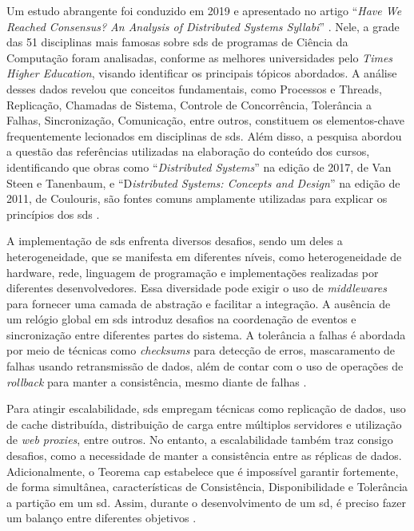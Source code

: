 Um estudo abrangente foi conduzido em 2019 e apresentado no artigo ``\textit{Have We Reached Consensus? An Analysis of Distributed Systems Syllabi}'' \cite{HaveWeReachedConsensus}. Nele, a grade das 51 disciplinas mais famosas sobre \gls{sds} de programas de Ciência da Computação foram analisadas, conforme as melhores universidades pelo \textit{Times Higher Education}, visando identificar os principais tópicos abordados. A análise desses dados revelou que conceitos fundamentais, como Processos e Threads, Replicação, Chamadas de Sistema, Controle de Concorrência, Tolerância a Falhas, Sincronização, Comunicação, entre outros, constituem os elementos-chave frequentemente lecionados em disciplinas de \gls{sds}. Além disso, a pesquisa abordou a questão das referências utilizadas na elaboração do conteúdo dos cursos, identificando que obras como ``\textit{Distributed Systems}'' na edição de 2017, de Van Steen e Tanenbaum, e ``D\textit{istributed Systems: Concepts and Design}'' na edição de 2011, de Coulouris, são fontes comuns amplamente utilizadas para explicar os princípios dos \gls{sds} \cite{HaveWeReachedConsensus}.

A implementação de \gls{sds} enfrenta diversos desafios, sendo um deles a heterogeneidade, que se manifesta em diferentes níveis, como heterogeneidade de hardware, rede, linguagem de programação e implementações realizadas por diferentes desenvolvedores. Essa diversidade pode exigir o uso de \textit{middlewares} para fornecer uma camada de abstração e facilitar a integração. A ausência de um relógio global em \gls{sds} introduz desafios na coordenação de eventos e sincronização entre diferentes partes do sistema. A tolerância a falhas é abordada por meio de técnicas como \textit{checksums} para detecção de erros, mascaramento de falhas usando retransmissão de dados, além de contar com o uso de operações de \textit{rollback} para manter a consistência, mesmo diante de falhas \cite{DistributedSystemsCoulouris}.

Para atingir escalabilidade, \gls{sds} empregam técnicas como replicação de dados, uso de cache distribuída, distribuição de carga entre múltiplos servidores e utilização de \textit{web proxies}, entre outros. No entanto, a escalabilidade também traz consigo desafios, como a necessidade de manter a consistência entre as réplicas de dados. Adicionalmente, o Teorema \gls{cap} estabelece que é impossível garantir fortemente, de forma simultânea, características de Consistência, Disponibilidade e Tolerância a partição em um \gls{sd}. Assim, durante o desenvolvimento de um \gls{sd}, é preciso fazer um balanço entre diferentes objetivos \cite{TwentyYearsLaterEricBrewer2012}.

